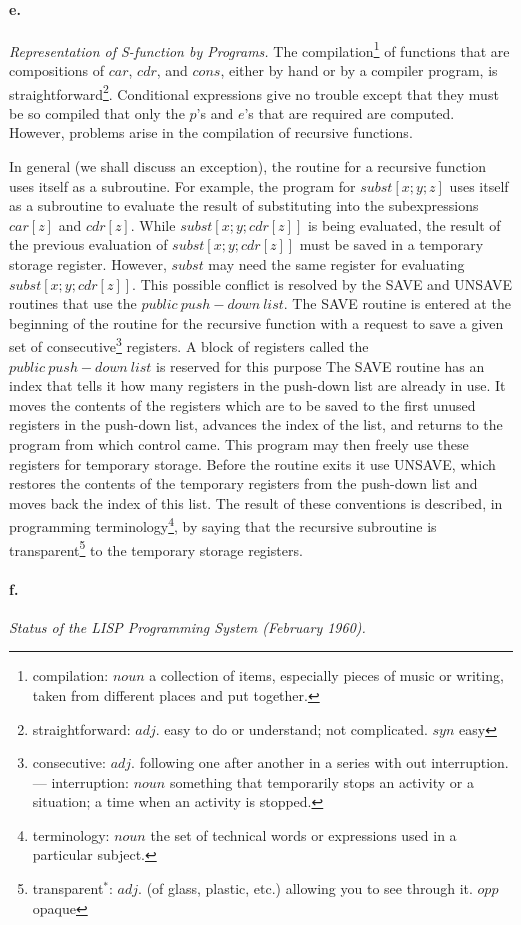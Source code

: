 \documentclass[11pt, a4paper]{article}
\begin{document}
\paragraph{e.}\textit{Representation of S-function by Programs.}
The
compilation\footnote{compilation: $noun$ a collection of items, especially
  pieces of music or writing, taken from different places and put together.}
of functions that are compositions of $car$, $cdr$, and $cons$,
either by hand or by a compiler program, is
straightforward\footnote{straightforward: $adj.$ easy to do or understand; not
  complicated. $syn$ easy}.
Conditional
expressions give no trouble except that they must be so compiled that only the
$p$'s and $e$'s that are required are computed. However, problems arise in the
compilation of recursive functions.

In general (we shall discuss an exception), the routine for a recursive function
uses itself as a subroutine. For example, the program for $subst[x; y; z]$ uses
itself as a subroutine to evaluate the result of substituting into the
subexpressions $car[z]$ and $cdr[z]$. While $subst[x; y; cdr[z]]$ is being
evaluated, the result of the previous evaluation of $subst[x; y; cdr[z]]$ must
be saved in a temporary storage register. However, $subst$ may need the same
register for evaluating $subst[x; y; cdr[z]]$. This possible conflict is
resolved by the SAVE and UNSAVE routines that use the $public \ push-down
\ list$. The SAVE routine is entered at the beginning of the routine for the
recursive function with a request to save a given set of
consecutive\footnote{consecutive: $adj.$ following one after another in a series
  with out interruption. --- interruption: $noun$ something that temporarily
  stops an activity or a situation; a time when an activity is stopped.}
registers. A block of registers called the $public \ push-down \ list$ is
reserved for this purpose The SAVE routine has an index that tells it how many
registers in the push-down list are already in use. It moves the contents of the
registers which are to be saved to the first unused registers in the push-down
list, advances the index of the list, and returns to the program from which
control came. This program may then freely use these registers for temporary
storage. Before the routine exits it use UNSAVE, which restores the contents of
the temporary registers from the push-down list and moves back the index of this
list. The result of these conventions is described, in programming
terminology\footnote{terminology: $noun$ the set of technical words or
  expressions used in a particular subject.},
by saying that the recursive subroutine is
transparent\footnote{transparent$^*$: $adj.$ (of glass, plastic, etc.) allowing
  you to see through it. $opp$ opaque}
to the temporary storage
registers.

\paragraph{f.}\textit{Status of the LISP Programming System (February 1960).}
\end{document}
